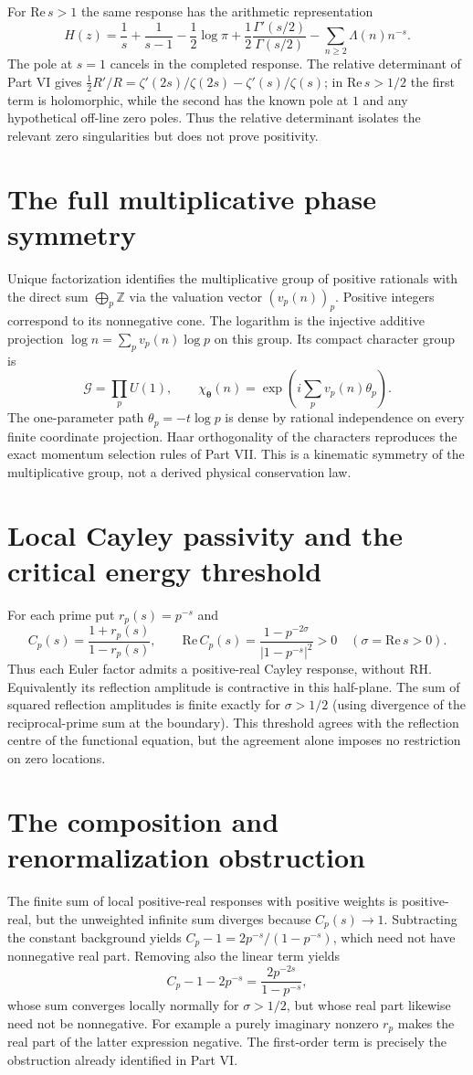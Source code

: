 \documentclass[11pt,a4paper]{article}
\theoremstyle{definition}\newtheorem{definition}[proposition]{Definition}
\theoremstyle{remark}\newtheorem{remark}[proposition]{Remark}
\begin{document}
For $\mathrm{Re}\,s>1$ the same response has the arithmetic representation
\[
H(z)=\frac1s+\frac1{s-1}-\frac12\log\pi+
\frac12\frac{\Gamma'(s/2)}{\Gamma(s/2)}
-\sum_{n\ge2}\Lambda(n)n^{-s}.
\]
The pole at $s=1$ cancels in the completed response. The relative determinant of Part VI gives
$\tfrac12 R'/R=\zeta'(2s)/\zeta(2s)-\zeta'(s)/\zeta(s)$;
in $\mathrm{Re}\,s>1/2$ the first term is holomorphic, while the second has the known pole at $1$ and any hypothetical off-line zero poles. Thus the relative determinant isolates the relevant zero singularities but does not prove positivity.

\section{The full multiplicative phase symmetry}
Unique factorization identifies the multiplicative group of positive rationals with the direct sum $\bigoplus_p\mathbb Z$ via the valuation vector $(v_p(n))_p$. Positive integers correspond to its nonnegative cone. The logarithm is the injective additive projection $\log n=\sum_p v_p(n)\log p$ on this group. Its compact character group is
\[
\mathcal G=\prod_p U(1),\qquad
\chi_{\boldsymbol\theta}(n)=\exp(i\sum_p v_p(n)\theta_p).
\]
The one-parameter path $\theta_p=-t\log p$ is dense by rational independence on every finite coordinate projection. Haar orthogonality of the characters reproduces the exact momentum selection rules of Part VII. This is a kinematic symmetry of the multiplicative group, not a derived physical conservation law.

\section{Local Cayley passivity and the critical energy threshold}
For each prime put $r_p(s)=p^{-s}$ and
\[
C_p(s)=\frac{1+r_p(s)}{1-r_p(s)},\qquad
\mathrm{Re}\,C_p(s)=\frac{1-p^{-2\sigma}}{|1-p^{-s}|^2}>0
\quad(\sigma=\mathrm{Re}\,s>0).
\]
Thus each Euler factor admits a positive-real Cayley response, without RH. Equivalently its reflection amplitude is contractive in this half-plane. The sum of squared reflection amplitudes is finite exactly for $\sigma>1/2$ (using divergence of the reciprocal-prime sum at the boundary). This threshold agrees with the reflection centre of the functional equation, but the agreement alone imposes no restriction on zero locations.

\section{The composition and renormalization obstruction}
The finite sum of local positive-real responses with positive weights is positive-real, but the unweighted infinite sum diverges because $C_p(s)\to1$. Subtracting the constant background yields
$C_p-1=2p^{-s}/(1-p^{-s})$, which need not have nonnegative real part. Removing also the linear term yields
\[
C_p-1-2p^{-s}=\frac{2p^{-2s}}{1-p^{-s}},
\]
whose sum converges locally normally for $\sigma>1/2$, but whose real part likewise need not be nonnegative. For example a purely imaginary nonzero $r_p$ makes the real part of the latter expression negative. The first-order term is precisely the obstruction already identified in Part VI.
\end{document}
